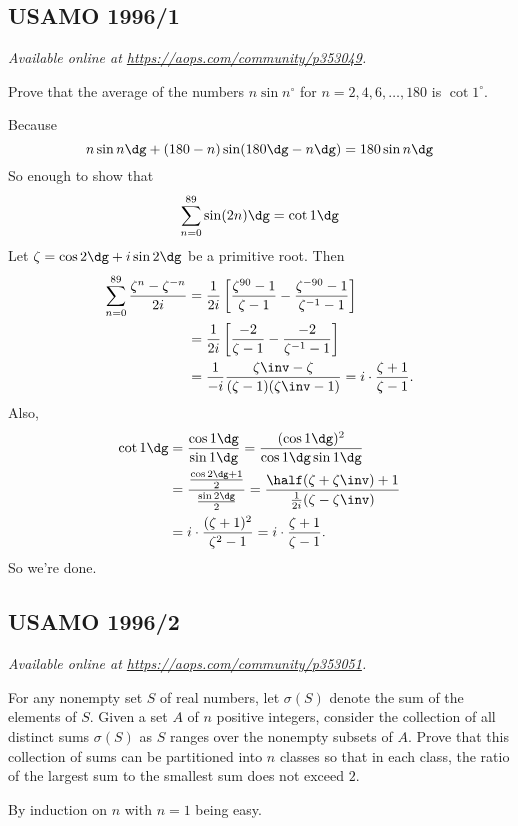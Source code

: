 \documentclass[11pt]{scrartcl}
\begin{document}
\subsection{USAMO 1996/1}
\textsl{Available online at \url{https://aops.com/community/p353049}.}
\begin{mdframed}[style=mdpurplebox,frametitle={Problem statement}]
Prove that the average of the numbers $n \sin n^{\circ}$ for
$n = 2,4,6,\dots,180$ is $\cot 1^{\circ}$.
\end{mdframed}
Because
\[ n \sin n\dg + (180-n) \sin(180\dg-n\dg) = 180 \sin n\dg \]
So enough to show that
\[ \sum_{n=0}^{89} \sin (2n)\dg = \cot1\dg \]
Let $\zeta = \cos2\dg + i \sin 2 \dg$ be a primitive root.
Then
\begin{align*}
  \sum_{n=0}^{89} \frac{\zeta^n - \zeta^{-n}}{2i}
  &= \frac{1}{2i}
  \left[ \frac{\zeta^{90}-1}{\zeta-1} - \frac{\zeta^{-90} - 1}{\zeta^{-1}-1} \right] \\
  &= \frac{1}{2i}
  \left[ \frac{-2}{\zeta-1} - \frac{-2}{\zeta^{-1}-1} \right] \\
  &= \frac{1}{-i} \frac{\zeta\inv-\zeta}{(\zeta-1)(\zeta\inv-1)}
  = i \cdot \frac{\zeta+1}{\zeta-1}.
\end{align*}
Also,
\begin{align*}
  \cot 1\dg &= \frac{\cos 1\dg}{\sin 1\dg}
  = \frac{(\cos1\dg)^2}{\cos1\dg\sin1\dg} \\
  &= \frac{\frac{\cos2\dg+1}{2}}{\frac{\sin2\dg}{2}}
  = \frac{\half(\zeta+\zeta\inv)+1}{\frac{1}{2i}(\zeta-\zeta\inv)} \\
  &= i \cdot \frac{(\zeta+1)^2}{\zeta^2-1} = i \cdot \frac{\zeta+1}{\zeta-1}.
\end{align*}
So we're done.
\pagebreak

\subsection{USAMO 1996/2}
\textsl{Available online at \url{https://aops.com/community/p353051}.}
\begin{mdframed}[style=mdpurplebox,frametitle={Problem statement}]
For any nonempty set $S$ of real numbers,
let $\sigma(S)$ denote the sum of the elements of $S$.
Given a set $A$ of $n$ positive integers,
consider the collection of all distinct sums $\sigma(S)$ as $S$ ranges
over the nonempty subsets of $A$.
Prove that this collection of sums can be
partitioned into $n$ classes so that in each class,
the ratio of the largest sum to the smallest sum does not exceed $2$.
\end{mdframed}
By induction on $n$ with $n=1$ being easy.
\end{document}
